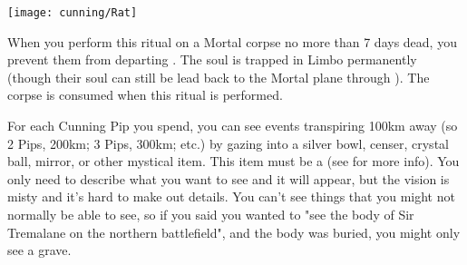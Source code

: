 

\begin{center}
\texttt{[image: cunning/Rat]}
\end{center}




\OCCULT[
  Name=Damning,
  Link=occultism-damning,
  Pips=5,
  Time=Days
]

When you perform this ritual on a Mortal corpse no more than 7 days dead, you prevent them from departing .  The soul is trapped in Limbo permanently (though their soul can still be lead back to the Mortal plane through ).  The corpse is consumed when this ritual is performed.


\OCCULT[
  Name=Descry,
  Link=occultism-descry,
  Pips=See below,
  Time=Days
]

For each Cunning Pip you spend, you can see events transpiring 100km away (so 2 Pips, 200km; 3 Pips, 300km; etc.) by gazing into a silver bowl, censer, crystal ball, mirror, or other mystical item. This item must be a  (see  for more info).  You only need to describe what you want to see and it will appear, but the vision is misty and it's hard to make out details.  You can't see things that you might not normally be able to see, so if you said you wanted to "see the body of Sir Tremalane on the northern battlefield", and the body was buried, you might only see a grave.

